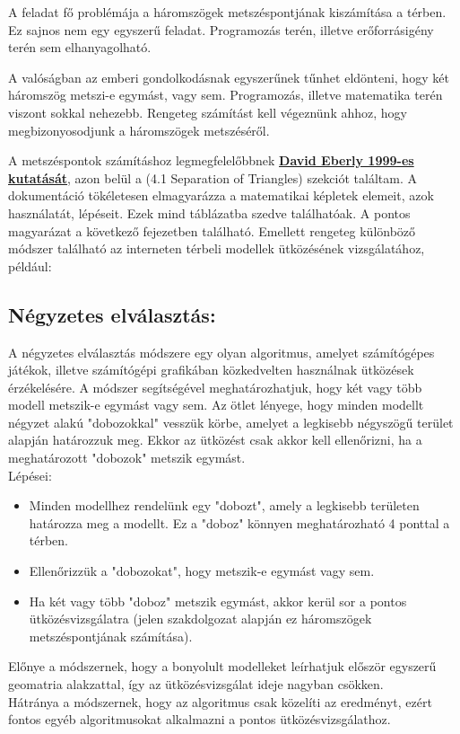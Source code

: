 
A feladat fő problémája a háromszögek metszéspontjának kiszámítása a térben. Ez sajnos nem egy egyszerű feladat. Programozás terén, illetve erőforrásigény terén sem elhanyagolható.

A valóságban az emberi gondolkodásnak egyszerűnek tűnhet eldönteni, hogy két háromszög metszi-e egymást, vagy sem. Programozás, illetve matematika terén viszont sokkal nehezebb. Rengeteg számítást kell végeznünk ahhoz, hogy megbizonyosodjunk a háromszögek metszéséről.

A metszéspontok számításhoz legmegfelelőbbnek \textbf{\href{https://www.geometrictools.com/Documentation/DynamicCollisionDetection.pdf}{David Eberly 1999-es kutatását}}, azon belül a \cite{triangles}(4.1 Separation of Triangles) szekciót találtam. A dokumentáció tökéletesen elmagyarázza a matematikai képletek elemeit, azok használatát, lépéseit. Ezek mind táblázatba szedve találhatóak. A pontos magyarázat a következő fejezetben található. Emellett rengeteg különböző módszer található az interneten térbeli modellek ütközésének vizsgálatához, például:\\
\newpage
\subsection{Négyzetes elválasztás:}
A négyzetes elválasztás módszere egy olyan algoritmus, amelyet számítógépes játékok, illetve számítógépi grafikában közkedvelten használnak ütközések érzékelésére.
A módszer segítségével meghatározhatjuk, hogy két vagy több modell metszik-e egymást vagy sem.
Az ötlet lényege, hogy minden modellt négyzet alakú "dobozokkal" vesszük körbe, amelyet a legkisebb négyszögű terület alapján határozzuk meg. Ekkor az ütközést csak akkor kell ellenőrizni, ha a meghatározott "dobozok" metszik egymást.\\
Lépései:
\begin{itemize}
\item Minden modellhez rendelünk egy "dobozt", amely a legkisebb területen határozza meg a modellt. Ez a "doboz" könnyen meghatározható 4 ponttal a térben.

\item Ellenőrizzük a "dobozokat", hogy metszik-e egymást vagy sem.

\item Ha két vagy több "doboz" metszik egymást, akkor kerül sor a pontos ütközésvizsgálatra (jelen szakdolgozat alapján ez háromszögek metszéspontjának számítása).
\end{itemize}
Előnye a módszernek, hogy a bonyolult modelleket leírhatjuk először egyszerű geomatria alakzattal, így az ütközésvizsgálat ideje nagyban csökken.\\
Hátránya a módszernek, hogy az algoritmus csak közelíti az eredményt, ezért fontos egyéb algoritmusokat alkalmazni a pontos ütközésvizsgálathoz.


